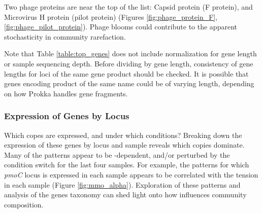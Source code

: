 Two phage proteins are near the top of the list: Capsid protein (F protein), and Microvirus H protein (pilot protein) (Figures \ref{fig:phage_protein_F}, \ref{fig:phage_pilot_protein}). %
Phage blooms could contribute to the apparent stochasticity in community rarefaction.

Note that Table \ref{table:top_genes} does not include normalization for gene length or sample sequencing depth.
Before dividing by gene length, consistency of gene lengths for loci of the same gene product should be checked.
It is possible that genes encoding product of the same name could be of varying length, depending on how Prokka handles gene fragments.

\subsubsection{Expression of Genes by Locus}

Which copes are expressed, and under which conditions?
Breaking down the expression of these genes by locus and sample reveals which copies dominate.
Many of the patterns appear to be -dependent, and/or perturbed by the  condition switch for the last four samples.
For example, the patterns for which \textit{pmoC} locus is expressed in each sample appears to be correlated with the  tension in each sample (Figure \ref{fig:mmo_alpha}).
Exploration of these patterns and analysis of the genes taxonomy can shed light onto how  influences community composition.

